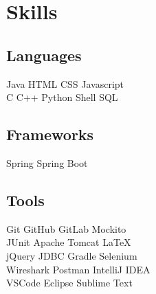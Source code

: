 \documentclass[]{deedy-resume-openfont}
\begin{document}
%
%
\lastupdated

%
%

%
%

\begin{minipage}[t]{0.33\textwidth} 


\section{Skills}
\subsection{Languages}
Java \textbullet{} HTML \textbullet{} CSS \textbullet{} Javascript \\
\textbullet{} C \textbullet{} C++ \textbullet{} Python 
\textbullet{} Shell \textbullet{} SQL \\

\subsection{Frameworks}
Spring \textbullet{} Spring Boot\\

\subsection{Tools}
Git \textbullet{} GitHub  \textbullet{} GitLab  \textbullet{} Mockito \\ \textbullet{} JUnit \textbullet{} Apache Tomcat  \textbullet{} LaTeX \\ \textbullet{} jQuery \textbullet{} JDBC \textbullet{} Gradle \textbullet{} Selenium \\ \textbullet{} Wireshark \textbullet{} Postman\textbullet{} IntelliJ IDEA \\ \textbullet{} VSCode  \textbullet{} Eclipse \textbullet{} Sublime Text
\sectionsep


\end{minipage}
\end{document}
